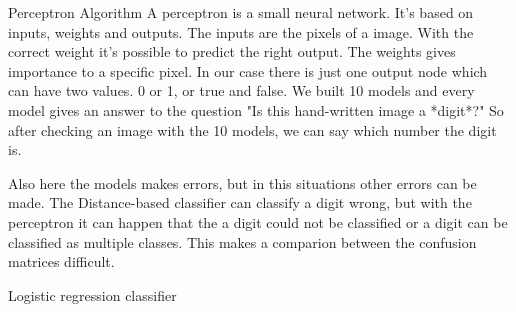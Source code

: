 \documentclass{article}
\begin{document}
Perceptron Algorithm
A perceptron is a small neural network. It's based on inputs, weights and outputs. The inputs are the pixels of a image. With the correct weight it's possible to predict the right output. The weights gives importance to a specific pixel. In our case there is just one output node which can have two values. 0 or 1, or true and false. We built 10 models and every model gives an answer to the question "Is this hand-written image a *digit*?" So after checking an image with the 10 models, we can say which number the digit is.

Also here the models makes errors, but in this situations other errors can be made. The Distance-based classifier can classify a digit wrong, but with the perceptron it can happen that the a digit could not be classified or a digit can be classified as multiple classes. This makes a comparion between the confusion matrices difficult. 

Logistic regression classifier
\end{document}
